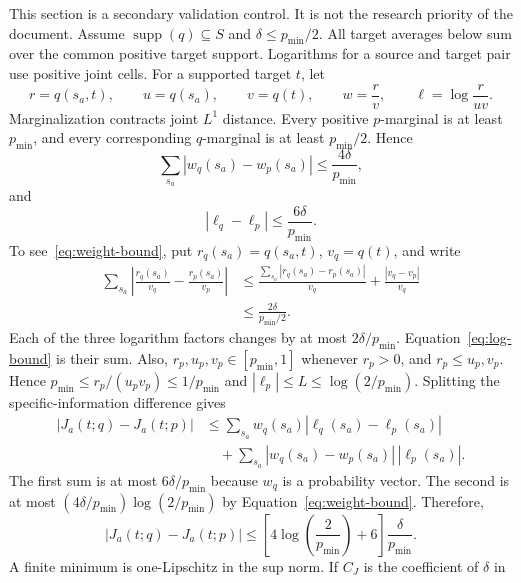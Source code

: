\documentclass[11pt]{article}
\theoremstyle{definition}
\newcommand{\supp}{\operatorname{supp}}
\begin{document}
This section is a secondary validation control.  It is not the research priority of the document.
Assume $\supp(q)\subseteq S$ and $\delta\le p_{\min}/2$.  All target averages below sum over the common positive target support. Logarithms for a source and target pair use positive joint cells. For a supported target $t$, let
\begin{equation}
  r=q(s_a,t),\qquad u=q(s_a),\qquad v=q(t),\qquad
  w=\frac{r}{v},\qquad \ell=\log\frac{r}{uv}.
\end{equation}
Marginalization contracts joint $L^1$ distance.  Every positive $p$-marginal is at least
$p_{\min}$, and every corresponding $q$-marginal is at least $p_{\min}/2$.  Hence
\begin{equation}\label{eq:weight-bound}
  \sum_{s_a}|w_q(s_a)-w_p(s_a)|
  \le \frac{4\delta}{p_{\min}},
\end{equation}
and
\begin{equation}\label{eq:log-bound}
  |\ell_q-\ell_p|\le\frac{6\delta}{p_{\min}}.
\end{equation}
To see~\eqref{eq:weight-bound}, put $r_q(s_a)=q(s_a,t)$, $v_q=q(t)$, and write
\begin{align}
  \sum_{s_a}\left|\frac{r_q(s_a)}{v_q}-\frac{r_p(s_a)}{v_p}\right|
  &\le
  \frac{\sum_{s_a}|r_q(s_a)-r_p(s_a)|}{v_q}
  +\frac{|v_q-v_p|}{v_q} \\
  &\le \frac{2\delta}{p_{\min}/2}.
\end{align}
	Each of the three logarithm factors changes by at most $2\delta/p_{\min}$.
	Equation~\eqref{eq:log-bound} is their sum.  Also,
	$r_p,u_p,v_p\in[p_{\min},1]$ whenever $r_p>0$, and $r_p\le u_p,v_p$.  Hence
	$p_{\min}\le r_p/(u_pv_p)\le1/p_{\min}$ and
	$|\ell_p|\le L\le\log(2/p_{\min})$.  Splitting the specific-information difference gives
	\begin{align}
	  |J_a(t;q)-J_a(t;p)|
	  &\le
	  \sum_{s_a}w_q(s_a)|\ell_q(s_a)-\ell_p(s_a)|\\
	  &\quad+
	  \sum_{s_a}|w_q(s_a)-w_p(s_a)|\,|\ell_p(s_a)|.
	\end{align}
	The first sum is at most $6\delta/p_{\min}$ because $w_q$ is a probability vector.  The second
	is at most $(4\delta/p_{\min})\log(2/p_{\min})$ by
	Equation~\eqref{eq:weight-bound}.  Therefore,
\begin{equation}\label{eq:imin-bound}
  |J_a(t;q)-J_a(t;p)|
  \le
  \left[4\log\left(\frac{2}{p_{\min}}\right)+6\right]
  \frac{\delta}{p_{\min}}.
\end{equation}
A finite minimum is one-Lipschitz in the sup norm.  If $C_J$ is the coefficient of $\delta$ in
\end{document}

